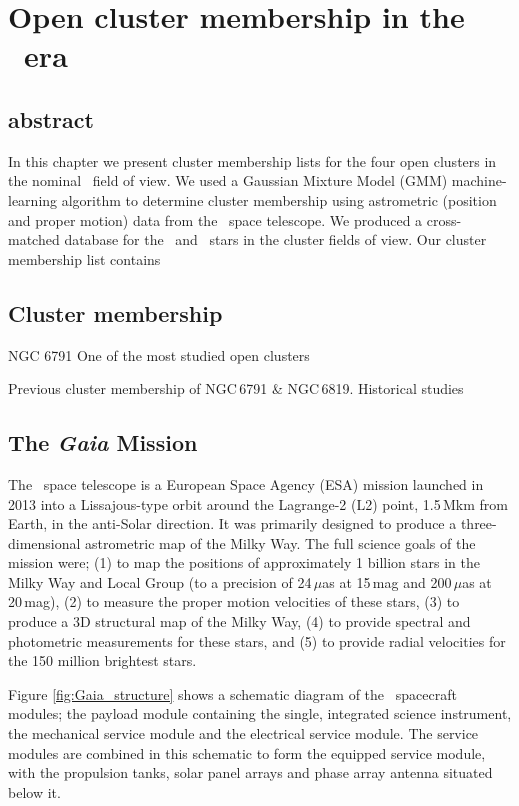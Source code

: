 \chapter[Gaia cluster membership]{Open cluster membership in the \Gaia~era}
\label{chap:membership}

\section*{abstract}
    In this chapter we present cluster membership lists for the four open clusters in the nominal \Kepler~field of view. We used a Gaussian Mixture Model (GMM) machine-learning algorithm to determine cluster membership using astrometric (position and proper motion) data from the \Gaia~space telescope. We produced a cross-matched database for the \Gaia~and \Kepler~stars in the cluster fields of view. Our cluster membership list contains 
\newpage
\section{Cluster membership}

NGC 6791
One of the most studied open clusters


Previous cluster membership of NGC\,6791 \& NGC\,6819.
Historical studies

\section{The {\em Gaia} Mission}
The \Gaia~space telescope is a European Space Agency (ESA) mission launched in 2013 into a Lissajous-type orbit around the Lagrange-2 (L2) point, 1.5\,Mkm from Earth, in the anti-Solar direction. It was primarily designed to produce a three-dimensional astrometric map of the Milky Way. The full science goals of the mission were; (1) to map the positions of approximately 1 billion stars in the Milky Way and Local Group (to a precision of 24\,$\mu$as at 15\,mag and 200\,$\mu$as at 20\,mag), (2) to measure the proper motion velocities of these stars, (3) to produce a 3D structural map of the Milky Way, (4) to provide spectral and photometric measurements for these stars, and (5) to provide radial velocities for the 150 million brightest stars.


Figure \ref{fig:Gaia_structure} shows a schematic diagram of the \Gaia~spacecraft modules; the payload module containing the single, integrated science instrument, the mechanical service module and the electrical service module. The service modules are combined in this schematic to form the equipped service module, with the propulsion tanks, solar panel arrays and phase array antenna situated below it.

